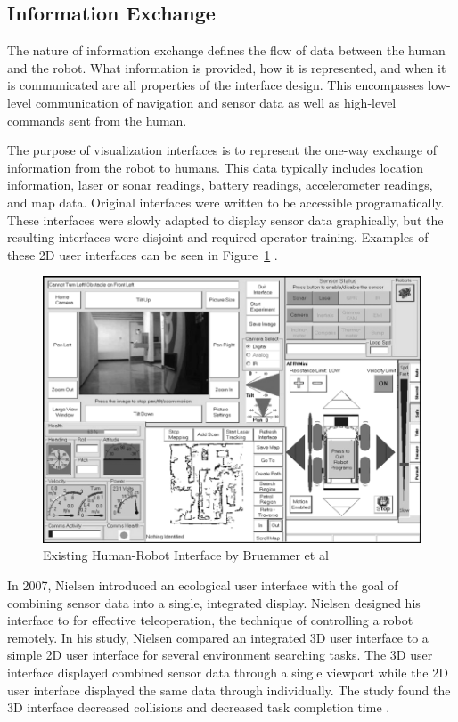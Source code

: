 \subsection{Information Exchange}
\label{sub:info_exchange}
The nature of information exchange defines the flow of data between the human and the robot. What information is provided, how it is represented, and when it is communicated are all properties of the interface design. This encompasses low-level communication of navigation and sensor data as well as high-level commands sent from the human. 

The purpose of visualization interfaces is to represent the one-way exchange of information from the robot to humans. This data typically includes location information, laser or sonar readings, battery readings, accelerometer readings, and map data. Original interfaces were written to be accessible programatically. These interfaces were slowly adapted to display sensor data graphically, but the resulting interfaces were disjoint and required operator training. Examples of these 2D user interfaces can be seen in Figure~\ref{fig:prior-hri} \cite{Bruemmer}.

\begin{figure}[ht]
\begin{center}
\includegraphics[width=5in]{images/prior-hri.png}
\caption{Existing Human-Robot Interface by Bruemmer et al
\label{fig:prior-hri}}
\end{center}
\end{figure}


In 2007, Nielsen introduced an ecological user interface with the goal of combining sensor data into a single, integrated display. Nielsen designed his interface to for effective teleoperation, the technique of controlling a robot remotely. In his study, Nielsen compared an integrated 3D user interface to a simple 2D user interface for several environment searching tasks. The 3D user interface displayed combined sensor data through a single viewport while the 2D user interface displayed the same data through individually. The study found the 3D interface decreased collisions and decreased task completion time \cite{Nielsen_Teleoperation}.

